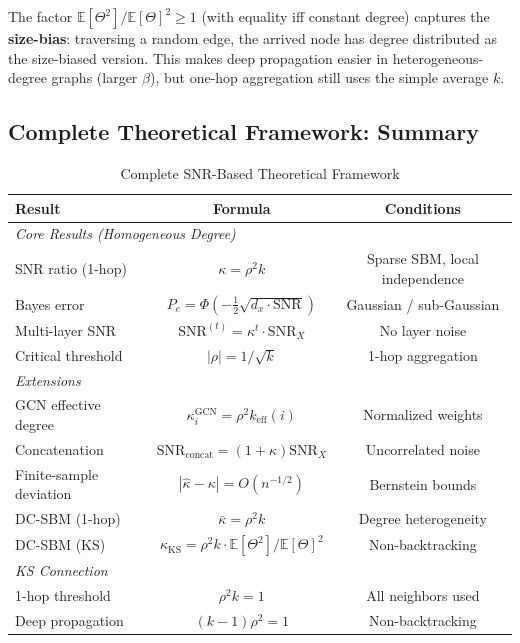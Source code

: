 \begin{remark}
The factor $\mathbb{E}[\Theta^2]/\mathbb{E}[\Theta]^2 \geq 1$ (with equality iff constant degree) captures the \textbf{size-bias}: traversing a random edge, the arrived node has degree distributed as the size-biased version. This makes deep propagation easier in heterogeneous-degree graphs (larger $\beta$), but one-hop aggregation still uses the simple average $k$.
\end{remark}

\subsection{Complete Theoretical Framework: Summary}
\label{subsec:complete_summary}

\begin{table}[t]
\centering
\caption{Complete SNR-Based Theoretical Framework}
\label{tab:complete_summary}
\begin{tabular}{@{}lcc@{}}
\toprule
\textbf{Result} & \textbf{Formula} & \textbf{Conditions} \\
\midrule
\multicolumn{3}{l}{\textit{Core Results (Homogeneous Degree)}} \\
SNR ratio (1-hop) & $\kappa = \rho^2 k$ & Sparse SBM, local independence \\
Bayes error & $P_e = \Phi(-\frac{1}{2}\sqrt{d_x \cdot \mathrm{SNR}})$ & Gaussian / sub-Gaussian \\
Multi-layer SNR & $\mathrm{SNR}^{(t)} = \kappa^t \cdot \mathrm{SNR}_X$ & No layer noise \\
Critical threshold & $|\rho| = 1/\sqrt{k}$ & 1-hop aggregation \\
\midrule
\multicolumn{3}{l}{\textit{Extensions}} \\
GCN effective degree & $\kappa_i^{\mathrm{GCN}} = \rho^2 k_{\mathrm{eff}}(i)$ & Normalized weights \\
Concatenation & $\mathrm{SNR}_{\mathrm{concat}} = (1+\kappa) \mathrm{SNR}_X$ & Uncorrelated noise \\
Finite-sample deviation & $|\hat{\kappa} - \kappa| = O(n^{-1/2})$ & Bernstein bounds \\
DC-SBM (1-hop) & $\bar{\kappa} = \rho^2 k$ & Degree heterogeneity \\
DC-SBM (KS) & $\kappa_{\mathrm{KS}} = \rho^2 k \cdot \mathbb{E}[\Theta^2]/\mathbb{E}[\Theta]^2$ & Non-backtracking \\
\midrule
\multicolumn{3}{l}{\textit{KS Connection}} \\
1-hop threshold & $\rho^2 k = 1$ & All neighbors used \\
Deep propagation & $(k-1)\rho^2 = 1$ & Non-backtracking \\
\bottomrule
\end{tabular}
\end{table}

